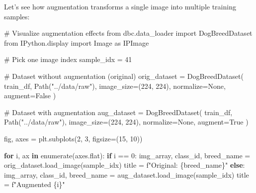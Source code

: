 \documentclass[
  letterpaper,
  DIV=11,
  numbers=noendperiod]{scrartcl}
\newenvironment{Shaded}{\begin{snugshade}}{\end{snugshade}}
\newcommand{\BuiltInTok}[1]{\textcolor[rgb]{0.00,0.23,0.31}{#1}}
\newcommand{\CommentTok}[1]{\textcolor[rgb]{0.37,0.37,0.37}{#1}}
\newcommand{\ControlFlowTok}[1]{\textcolor[rgb]{0.00,0.23,0.31}{\textbf{#1}}}
\newcommand{\DecValTok}[1]{\textcolor[rgb]{0.68,0.00,0.00}{#1}}
\newcommand{\ImportTok}[1]{\textcolor[rgb]{0.00,0.46,0.62}{#1}}
\newcommand{\KeywordTok}[1]{\textcolor[rgb]{0.00,0.23,0.31}{\textbf{#1}}}
\newcommand{\NormalTok}[1]{\textcolor[rgb]{0.00,0.23,0.31}{#1}}
\newcommand{\OperatorTok}[1]{\textcolor[rgb]{0.37,0.37,0.37}{#1}}
\newcommand{\SpecialCharTok}[1]{\textcolor[rgb]{0.37,0.37,0.37}{#1}}
\newcommand{\SpecialStringTok}[1]{\textcolor[rgb]{0.13,0.47,0.30}{#1}}
\newcommand{\StringTok}[1]{\textcolor[rgb]{0.13,0.47,0.30}{#1}}
\newcommand{\VariableTok}[1]{\textcolor[rgb]{0.07,0.07,0.07}{#1}}
\renewenvironment{Shaded}{%
  \begin{tcolorbox}[%
    enhanced,%
    colback=codebg,%
    colframe=codebg,%
    borderline west={3pt}{0pt}{sectionblue},%
    boxrule=0pt,%
    arc=0pt,%
    boxsep=5pt,%
    left=2mm,%
    right=2mm,%
    top=2mm,%
    bottom=2mm%
  ]%
}{%
  \end{tcolorbox}%
}
\begin{document}
Let's see how augmentation transforms a single image into multiple
training samples:

\begin{Shaded}
\begin{Highlighting}[]
\CommentTok{\# Visualize augmentation effects}
\ImportTok{from}\NormalTok{ dbc.data\_loader }\ImportTok{import}\NormalTok{ DogBreedDataset}
\ImportTok{from}\NormalTok{ IPython.display }\ImportTok{import}\NormalTok{ Image }\ImportTok{as}\NormalTok{ IPImage}

\CommentTok{\# Pick one image index}
\NormalTok{sample\_idx }\OperatorTok{=} \DecValTok{41}

\CommentTok{\# Dataset without augmentation (original)}
\NormalTok{orig\_dataset }\OperatorTok{=}\NormalTok{ DogBreedDataset(}
\NormalTok{    train\_df,}
\NormalTok{    Path(}\StringTok{"../data/raw"}\NormalTok{),}
\NormalTok{    image\_size}\OperatorTok{=}\NormalTok{(}\DecValTok{224}\NormalTok{, }\DecValTok{224}\NormalTok{),}
\NormalTok{    normalize}\OperatorTok{=}\VariableTok{None}\NormalTok{,}
\NormalTok{    augment}\OperatorTok{=}\VariableTok{False}
\NormalTok{)}

\CommentTok{\# Dataset with augmentation}
\NormalTok{aug\_dataset }\OperatorTok{=}\NormalTok{ DogBreedDataset(}
\NormalTok{    train\_df,}
\NormalTok{    Path(}\StringTok{"../data/raw"}\NormalTok{),}
\NormalTok{    image\_size}\OperatorTok{=}\NormalTok{(}\DecValTok{224}\NormalTok{, }\DecValTok{224}\NormalTok{),}
\NormalTok{    normalize}\OperatorTok{=}\VariableTok{None}\NormalTok{,}
\NormalTok{    augment}\OperatorTok{=}\VariableTok{True}
\NormalTok{)}

\NormalTok{fig, axes }\OperatorTok{=}\NormalTok{ plt.subplots(}\DecValTok{2}\NormalTok{, }\DecValTok{3}\NormalTok{, figsize}\OperatorTok{=}\NormalTok{(}\DecValTok{15}\NormalTok{, }\DecValTok{10}\NormalTok{))}

\ControlFlowTok{for}\NormalTok{ i, ax }\KeywordTok{in} \BuiltInTok{enumerate}\NormalTok{(axes.flat):}
    \ControlFlowTok{if}\NormalTok{ i }\OperatorTok{==} \DecValTok{0}\NormalTok{:}
\NormalTok{        img\_array, class\_id, breed\_name }\OperatorTok{=}\NormalTok{ orig\_dataset.load\_image(sample\_idx)}
\NormalTok{        title }\OperatorTok{=} \SpecialStringTok{f"Original: }\SpecialCharTok{\{}\NormalTok{breed\_name}\SpecialCharTok{\}}\SpecialStringTok{"}
    \ControlFlowTok{else}\NormalTok{:}
\NormalTok{        img\_array, class\_id, breed\_name }\OperatorTok{=}\NormalTok{ aug\_dataset.load\_image(sample\_idx)}
\NormalTok{        title }\OperatorTok{=} \SpecialStringTok{f"Augmented }\SpecialCharTok{\{}\NormalTok{i}\SpecialCharTok{\}}\SpecialStringTok{"}
    

\end{Highlighting}
\end{Shaded}
\end{document}
